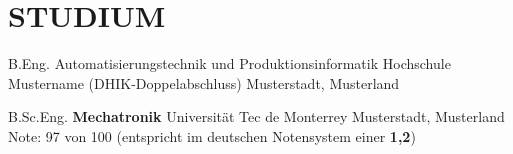 \section{STUDIUM}
            {B.Eng. Automatisierungstechnik und Produktionsinformatik}
            {Hochschule Mustername (DHIK-Doppelabschluss)}
            {Musterstadt, Musterland}
            {}
            {} 
    
    \vspace{10pt}
    
            {B.Sc.Eng. \textbf{Mechatronik}}
            {Universität Tec de Monterrey}
            {Musterstadt, Musterland}
            {}
            {Note: 97 von 100 (entspricht im deutschen Notensystem einer \textbf{1,2})}